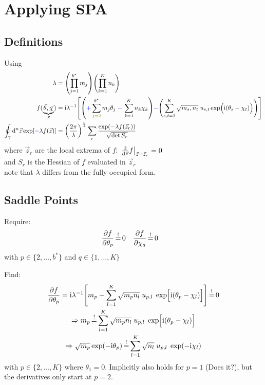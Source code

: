\documentclass[
	english,
	a4paper,
	fontsize=10pt,
	parskip=half,
	titlepage=true,
	DIV=12,
	final
]{scrreprt}
\newcommand*{\Thus}{\ensuremath{\Rightarrow}\xspace}
\newcommand*{\iunit}{\ensuremath{\mathrm{i}}}
\newcommand*{\equalCond}{  \mathop{=}\limits^!  }
\begin{document}
\section{Applying SPA}
\subsection{Definitions}
Using
\begin{align}
	\lambda
&=
	\qty( \prod_{j=1}^{b^*} m_j )
	\qty( \prod_{k=1}^{K}   n_k )
\label{eqn:DefLambda_m}
\\
	f(
		\underbrace{ \vec{\theta}, \vec{\chi} }_{\vec{z}}
	)
&=
	\iunit
	\lambda^{-1}
	\qty[
		\qty(
			{\color{blue} +}
			\sum_{{\color{olive}j=2}}^{b^*}
				m_j \theta_j \;
			{\color{blue} -} \,
			\sum_{k=1}^{K}
				n_k \chi  _k
		)
	{\color{blue} -}
		\qty(
			\sum_{s,t=1}^{K}
			\sqrt{m_s, n_t} \;
			u_{s,t}
			\exp(\Big.
				\iunit(\theta_s - \chi_t)
			)
		)
	]
\\
	\oint_{\gamma} \dd[n]{\vec{z}}
		\exp[{\color{blue} -}\lambda f(\vec{z})]
&=
	\qty( \frac
		{2\pi}
		{\lambda}
	)^{\frac{n}{2}}
	\sum_{r}
		\frac
		{\exp(-\lambda f(\vec{z}_r))}
		{\sqrt{\det S_r}}
\label{eqn:Def_SPA}
\end{align}
where $\vec{z}_r$ are the local extrema of $f$: $\eval{\dv{\vec{z}}f}_{\vec{z} = \vec{z}_r} = 0$\\
and $S_r$ is the Hessian of $f$ evaluated in $\vec{z}_r$\\
{\color{red} note that $\lambda$ differs from the fully occupied form.}

\subsection{Saddle Points}
\label{sec:saddles}
Require:
\begin{align}
	\pdv{f}{\theta_p} &\equalCond 0
&
	\pdv{f}{\chi  _q} &\equalCond 0 
\end{align}
with $p \in \{2, \ldots, b^*\}$ and $q \in \{1, \ldots, K\}$

Find:
\begin{gather}
	\pdv{f}{\theta_p}
=
	\iunit \lambda^{-1}
	\qty[
		m_p
		-
		\sum_{l=1}^{K}
			\sqrt{m_p n_l} \; u_{p,l} \; \exp[ \Big. \iunit(\theta_p - \chi_l)]
	]
	\label{eqn:Jacobiantheta_m}
\equalCond
	0 \\
\Thus
	m_p
\equalCond
	\sum_{l=1}^{K}
		\sqrt{m_p n_l} \; u_{p,l} \; \exp[ \Big. \iunit(\theta_p - \chi_l) ] \\
\Thus
	\sqrt{m_p} \exp(-\iunit \theta_p)
\equalCond
	\sum_{l=1}^{K} \sqrt{n_l} \; u_{p,l} \; \exp(-\iunit\chi_l)
	\label{eqn:FourierLinkForward_m}
\end{gather}
with $p \in \{2, \ldots, K\}$ where $\theta_1 = 0$. Implicitly also holds for $p=1$ {\color{red}(Does it?)}, but the derivatives only start at $p=2$.
\end{document}
